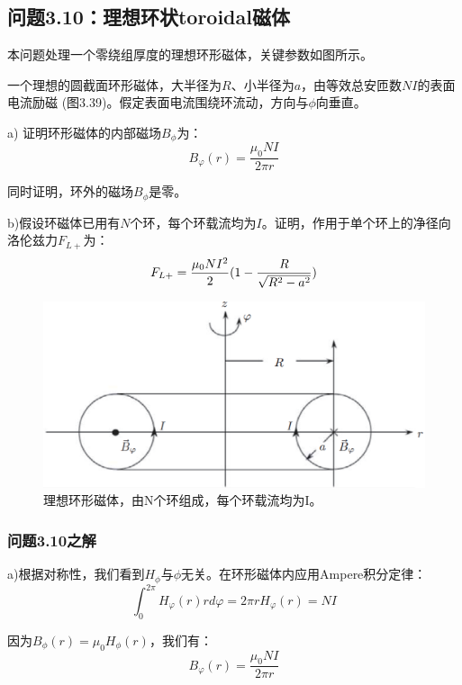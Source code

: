 \subsection{问题3.10：理想环状toroidal磁体}
本问题处理一个零绕组厚度的理想环形磁体，关键参数如图所示。

一个理想的圆截面环形磁体，大半径为$R$、小半径为$a$，由等效总安匝数$NI$的表面电流励磁
(图3.39)。假定表面电流围绕环流动，方向与$\phi$向垂直。

a) 证明环形磁体的内部磁场$B_\phi$为：
\begin{equation}
B_{\varphi}(r)=\frac{\mu_{0}NI}{2\pi r}%
\end{equation}

同时证明，环外的磁场$B_\phi$是零。

b)假设环磁体已用有$N$个环，每个环载流均为$I$。证明，作用于单个环上的净径向洛伦兹力$F_{L+}$为：
\begin{equation}
F_{L+}=\frac{\mu_{0}NI^{2}}{2}(1-\frac{R}{\sqrt{R^{2}-a^{2}}})\\%
\end{equation}
\begin{figure}[htbp]
	\centering
	\includegraphics[scale=0.5]{chpt3/figs/fig3.39.eps}
	\caption{理想环形磁体，由N个环组成，每个环载流均为I。}
\end{figure}

\subsubsection{问题3.10之解}
a)根据对称性，我们看到$H_\phi$与$\phi$无关。在环形磁体内应用Ampere积分定律： 
\begin{equation*}
\int_{0}^{2\pi}H_{\varphi}(r)rd\varphi=2\pi rH_{\varphi}(r)=NI\tag{S10.1}%
\end{equation*}

因为$B_\phi(r)=\mu_0 H_\phi(r)$，我们有：
\begin{equation*}
B_{\varphi}(r)=\frac{\mu_{0}NI}{2\pi r}\tag{3.161}%
\end{equation*}

